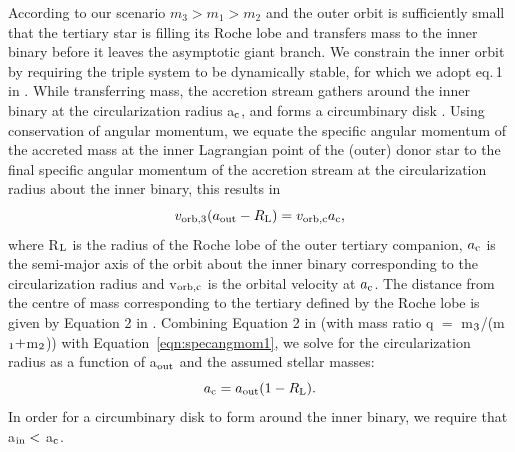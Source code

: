 \documentclass{aastex62}
\begin{document}
According to our scenario $m_3 > m_1 > m_2$ and the outer orbit is
sufficiently small that the tertiary star is filling its Roche lobe
and transfers mass to the inner binary before it leaves the asymptotic
giant branch. We constrain the inner orbit by requiring the triple
system to be dynamically stable, for which we adopt eq.\,1 in
\cite{1999ASIC..522..385M,}.  While transferring mass, the accretion
stream gathers around the inner binary at the circularization radius
a$_{\rm c}$, and forms a circumbinary disk
\citep{2002apa..book.....F}.  Using conservation of angular momentum,
we equate the specific angular momentum of the accreted mass at the
inner Lagrangian point of the (outer) donor star to the final specific
angular momentum of the accretion stream at the circularization radius
about the inner binary, this results in
\begin{equation}
\label{eqn:specangmom1}
v_{\rm orb,3}(a_{\rm out} - R_{\rm L}) = v_{\rm orb,c}a_{\rm c},
\end{equation}
where R$_{\rm L}$ is the radius of the Roche lobe of the outer
tertiary companion, $a_{\rm c}$ is the semi-major axis of the orbit
about the inner binary corresponding to the circularization radius and
v$_{\rm orb,c}$ is the orbital velocity at $a_{\rm c}$.  The distance
from the centre of mass corresponding to the tertiary defined by the
Roche lobe is given by Equation 2 in \citep{1983ApJ...268..368E}.
Combining Equation 2 in \citet{1983ApJ...268..368E} (with mass ratio q
$=$ m$_{\rm 3}$/(m$_{\rm 1} +$m$_{\rm 2}$)) with
Equation~\ref{eqn:specangmom1}, we solve for the circularization
radius as a function of a$_{\rm out}$ and the assumed stellar masses:
\begin{equation}
\label{eqn:ac}
a_{\rm c} = a_{\rm out}(1 - R_{\rm L}).
\end{equation}
In order for a circumbinary disk to form around the inner binary, we
require that a$_{\rm in} <$ a$_{\rm c}$.
\end{document}
